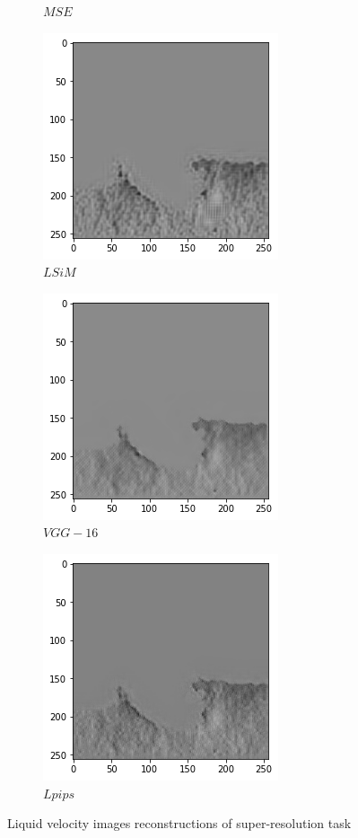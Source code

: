 \documentclass[a4paper,12pt,twoside]{report}
\begin{document}
\begin{figure}
\begin{subfigure}{0.32\textwidth}
		\caption{$MSE$}
	\end{subfigure}
	\begin{subfigure}{0.32\textwidth}
		\centering
		\includegraphics[scale=0.4]{superresolution/liquidvel_lsim.png}
		\caption{$LSiM$}
	\end{subfigure}
	\begin{subfigure}{0.32\textwidth}
		\centering
		\includegraphics[scale=0.4]{superresolution/liquidvel_vgg.png}
		\caption{$VGG-16$}
	\end{subfigure}
	\begin{subfigure}{0.32\textwidth}
		\centering
		\includegraphics[scale=0.4]{superresolution/liquidvel_lpips.png}
		\caption{$Lpips$}
	\end{subfigure}
	\caption{Liquid velocity images reconstructions of super-resolution task}
	\label{super liquid}
\end{figure}
\end{document}
